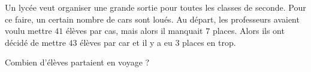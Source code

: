 
\begin{exercice}\label{exosmath-0323}

    Un lycée veut organiser une grande sortie pour toutes les classes de seconde. Pour ce faire, un certain nombre de cars sont loués. Au départ, les professeurs avaient voulu mettre \( 41\) élèves par cas, mais alors il manquait \( 7\) places. Alors ils ont décidé de mettre \( 43\) élèves par car et il y a eu \( 3\) places en trop.

    Combien d'élèves partaient en voyage ?

\end{exercice}
